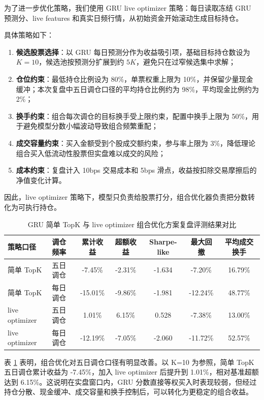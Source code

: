 \documentclass[12pt,a4paper,cn,bibtex]{elegantpaper}
\begin{document}
为了进一步优化策略，我们使用 GRU live optimizer 策略：每日读取冻结 GRU 预测分、live features 和真实日频行情，从初始资金开始滚动生成目标持仓。

具体策略如下：
\begin{enumerate}[label=\arabic*)]
    \item \textbf{候选股票选择}：以 GRU 每日预测分作为收益吸引项，基础目标持仓数设为 $K=10$，候选池按预测分扩展到约 $5K$，避免只在过窄候选集中求解；
    \item \textbf{仓位约束}：最低持仓比例设为 80\%，单票权重上限为 10\%，并保留少量现金缓冲；本次复盘中五日调仓口径的平均持仓比例约为 98\%，平均现金比例约为 2\%；
    \item \textbf{换手约束}：组合每次调仓的目标换手受上限约束，配置中换手上限为 50\%，用于避免模型分数小幅波动导致组合频繁重配；
    \item \textbf{成交容量约束}：买入金额受到个股成交额约束，参与率上限为 3\%，降低理论组合买入低流动性股票但实盘难以成交的风险；
    \item \textbf{成本约束}：复盘计入 10bps 交易成本和 5bps 滑点，收益按扣除交易摩擦后的净值变化计算。
\end{enumerate}

因此，live optimizer 策略下，模型只负责给股票打分，组合优化器负责把分数转化为可执行持仓。

\begin{table}[H]
    \centering
    \small
    \setlength{\tabcolsep}{3pt}
    \begin{tabular}{llccccc}
        \toprule
        \textbf{策略口径} & \textbf{调仓频率} & \textbf{累计收益} & \textbf{超额收益} & \textbf{Sharpe-like} & \textbf{最大回撤} & \textbf{平均成交换手} \\
        \midrule
        简单 TopK & 五日调仓 & -7.45\% & -2.31\% & -1.634 & -7.20\% & 16.79\% \\
        简单 TopK & 每日调仓 & -15.01\% & -9.86\% & -1.981 & -12.24\% & 48.77\% \\
        live optimizer & 五日调仓 & 1.01\% & 6.15\% & 0.528 & -7.38\% & 13.00\% \\
        live optimizer & 每日调仓 & -12.19\% & -7.05\% & -2.060 & -11.72\% & 52.57\% \\
        \bottomrule
    \end{tabular}
    \caption{GRU 简单 TopK 与 live optimizer 组合优化方案复盘评测结果对比}
    \label{tab:gru-live-optimizer}
\end{table}

表 \ref{tab:gru-live-optimizer} 表明，组合优化对五日调仓口径有明显改善。以 K=10 为参照，简单 TopK 五日调仓累计收益为 -7.45\%，加入 live optimizer 后提升到 1.01\%，相对基准超额达到 6.15\%。这说明在实盘窗口内，GRU 分数直接等权买入时表现较弱，但经过持仓分散、现金缓冲、成交容量和换手控制后，可以转化为更稳定的组合收益。
\end{document}
